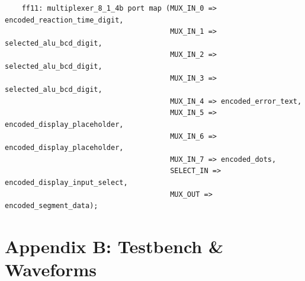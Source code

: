 \documentclass[11pt]{article}
\newenvironment{code}{\captionsetup{type=listing}}{}
\begin{document}
\vspace*{1cm}

\begin{code}
  \begin{verbatim}
    ff11: multiplexer_8_1_4b port map (MUX_IN_0 => encoded_reaction_time_digit,
                                       MUX_IN_1 => selected_alu_bcd_digit,
                                       MUX_IN_2 => selected_alu_bcd_digit,
                                       MUX_IN_3 => selected_alu_bcd_digit,
                                       MUX_IN_4 => encoded_error_text,
                                       MUX_IN_5 => encoded_display_placeholder,
                                       MUX_IN_6 => encoded_display_placeholder,
                                       MUX_IN_7 => encoded_dots,
                                       SELECT_IN => encoded_display_input_select,
                                       MUX_OUT => encoded_segment_data);
  \end{verbatim}
  \captionsetup{belowskip=0pt}
  \label{code:output_select_mux_instantiation}
\end{code}

\newpage

\section{Appendix B: Testbench \& Waveforms}
\end{document}
